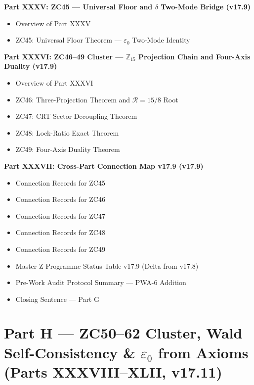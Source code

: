 \documentclass[11pt, a4paper]{article}
\begin{document}
\begin{contentsbox}[title={Part G --- Part and Section Headers}]
\textbf{Part XXXV: ZC45 --- Universal Floor and $\delta$ Two-Mode
  Bridge (v17.9)}
\begin{itemize}[noitemsep,leftmargin=1.5em]
  \item Overview of Part XXXV
  \item ZC45: Universal Floor Theorem --- $\varepsilon_0$ Two-Mode Identity
\end{itemize}

\textbf{Part XXXVI: ZC46--49 Cluster ---
  $\mathbb{Z}_{15}$ Projection Chain and Four-Axis Duality (v17.9)}
\begin{itemize}[noitemsep,leftmargin=1.5em]
  \item Overview of Part XXXVI
  \item ZC46: Three-Projection Theorem and $\mathcal{R}=15/8$ Root
  \item ZC47: CRT Sector Decoupling Theorem
  \item ZC48: Lock-Ratio Exact Theorem
  \item ZC49: Four-Axis Duality Theorem
\end{itemize}

\textbf{Part XXXVII: Cross-Part Connection Map v17.9 (v17.9)}
\begin{itemize}[noitemsep,leftmargin=1.5em]
  \item Connection Records for ZC45
  \item Connection Records for ZC46
  \item Connection Records for ZC47
  \item Connection Records for ZC48
  \item Connection Records for ZC49
  \item Master Z-Programme Status Table v17.9 (Delta from v17.8)
  \item Pre-Work Audit Protocol Summary --- PWA-6 Addition
  \item Closing Sentence --- Part G
\end{itemize}
\end{contentsbox}




\section{Part H --- ZC50--62 Cluster, Wald Self-Consistency \&
  $\varepsilon_0$ from Axioms (Parts XXXVIII--XLII, v17.11)}
\end{document}
